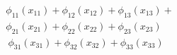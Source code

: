 \documentclass[preview]{standalone}
\begin{document}
\begin{align*}
\phi_{11}( x_{11}) + \phi_{12} (x_{12})+ \phi_{13} (x_{13})+\\ \phi_{21} (x_{21}) + \phi_{22} (x_{22})+\phi_{23} (x_{23}) \\\ \phi_{31} (x_{31}) + \phi_{32} (x_{32})+\phi_{33} (x_{33})
\end{align*}
\end{document}
